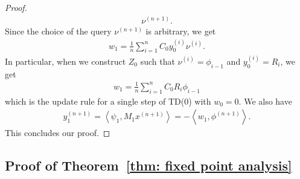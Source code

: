\documentclass{article}
\newcommand{\indot}[2]{{\left<#1, #2\right>}}
\begin{document}
\begin{proof}
\begin{align}
{        \nu^{(n+1)}}.
    \end{align}
    Since the choice of the query $\nu^{(n+1)}$ is arbitrary, we get
    \begin{align}
        w_{1} = \frac{1}{n}\sum_{i=1}^n C_0 y_0^{(i)} \nu^{(i)}.
    \end{align}
    In particular, when we construct $Z_0$ such that $\nu^{(i)} = \phi_{i-1}$ and $y_0^{(i)} = R_i$,
    we get
    \begin{align}
        w_1 = \frac{1}{n}\sum_{i=1}^n C_0 R_i \phi_{i-1}
    \end{align}
    which is the update rule for a single step of TD(0) with $w_0 = 0$.
    We also have
    \begin{align}
        y_1^{(n+1)}
        = \indot{\psi_1}{M_1 x^{(n+1)}}
        = -\indot{w_1}{\phi^{(n+1)}}.
    \end{align}
    This concludes our proof.
    \end{proof}
\subsection{Proof of Theorem~\ref{thm: fixed point analysis}}
\label{sec proof thm: fixed point analysis}
\end{document}
